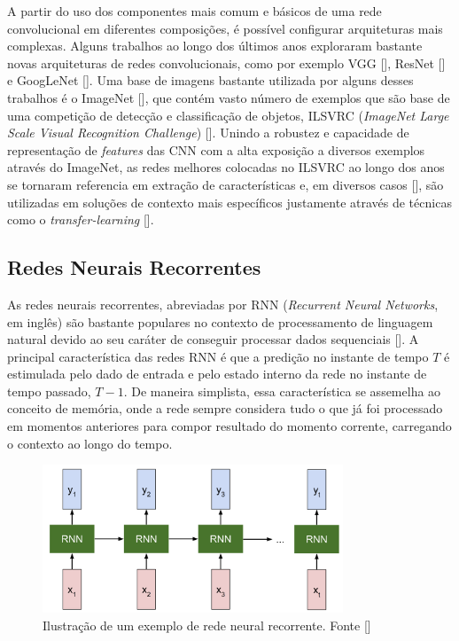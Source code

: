 A partir do uso dos componentes mais comum e básicos de uma rede convolucional em diferentes composições, é possível configurar arquiteturas mais complexas. Alguns trabalhos ao longo dos últimos anos exploraram bastante novas arquiteturas de redes convolucionais, como por exemplo VGG [], ResNet [] e GoogLeNet []. Uma base de imagens bastante utilizada por alguns desses trabalhos é o ImageNet [], que contém vasto número de exemplos que são base de uma competição de detecção e classificação de objetos, ILSVRC (\textit{ImageNet Large Scale Visual Recognition Challenge}) []. Unindo a robustez e capacidade de representação de \textit{features} das CNN com a alta exposição a diversos exemplos através do ImageNet, as redes melhores colocadas no ILSVRC ao longo dos anos se tornaram referencia em extração de características e, em diversos casos [], são utilizadas em soluções de contexto mais específicos justamente através de técnicas como o \textit{transfer-learning} [].


\subsection{Redes Neurais Recorrentes}
As redes neurais recorrentes, abreviadas por RNN (\textit{Recurrent Neural Networks}, em inglês) são bastante populares no contexto de processamento de linguagem natural devido ao seu caráter de conseguir processar dados sequenciais []. A principal característica das redes RNN é que a predição no instante de tempo $T$ é estimulada pelo dado de entrada e pelo estado interno da rede no instante de tempo passado, $T - 1$. De maneira simplista, essa característica se assemelha ao conceito de memória, onde a rede sempre considera tudo o que já foi processado em momentos anteriores para compor resultado do momento corrente, carregando o contexto ao longo do tempo.

\begin{figure}
    \centering
    \includegraphics[width=0.8\textwidth]{figs/theory-example-rnn.png}
    \caption{Ilustração de um exemplo de rede neural recorrente. Fonte []}
    \label{fig:theory-rnn-example}
\end{figure}

